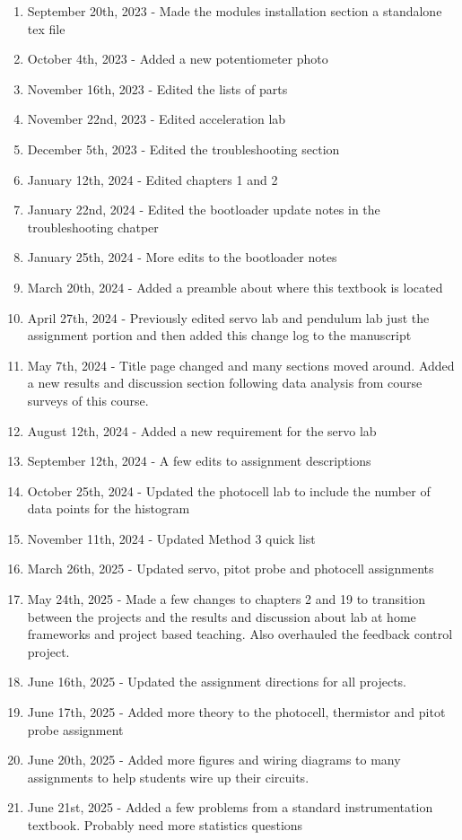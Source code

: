 \documentclass{article}
\begin{document}
\begin{enumerate}[itemsep=-5pt]
\item September 20th, 2023 - Made the modules installation section a standalone tex file
\item October 4th, 2023 - Added a new potentiometer photo
\item November 16th, 2023 - Edited the lists of parts 
\item November 22nd, 2023 - Edited acceleration lab
\item December 5th, 2023 - Edited the troubleshooting section
\item January 12th, 2024 - Edited chapters 1 and 2
\item January 22nd, 2024 - Edited the bootloader update notes in the troubleshooting chatper
\item January 25th, 2024 - More edits to the bootloader notes
\item March 20th, 2024 - Added a preamble about where this textbook is located
\item April 27th, 2024 - Previously edited servo lab and pendulum lab just the assignment portion and then added this change log to the manuscript
\item May 7th, 2024 - Title page changed and many sections moved around. Added a new results and discussion section following data analysis from course surveys of this course.
\item August 12th, 2024 - Added a new requirement for the servo lab
\item September 12th, 2024 - A few edits to assignment descriptions
\item October 25th, 2024 - Updated the photocell lab to include the number of data points for the histogram
\item November 11th, 2024 - Updated Method 3 quick list
\item March 26th, 2025 - Updated servo, pitot probe and photocell assignments
\item May 24th, 2025 - Made a few changes to chapters 2 and 19 to transition between the projects and the results and discussion about lab at home frameworks and project based teaching. Also overhauled the feedback control project. 
\item June 16th, 2025 - Updated the assignment directions for all projects.
\item June 17th, 2025 - Added more theory to the photocell, thermistor and pitot probe assignment
\item June 20th, 2025 - Added more figures and wiring diagrams to many assignments to help students wire up their circuits.
\item June 21st, 2025 - Added a few problems from a standard instrumentation textbook. Probably need more statistics questions
\end{enumerate}

\newpage

\tableofcontents

\newpage













\end{document}
